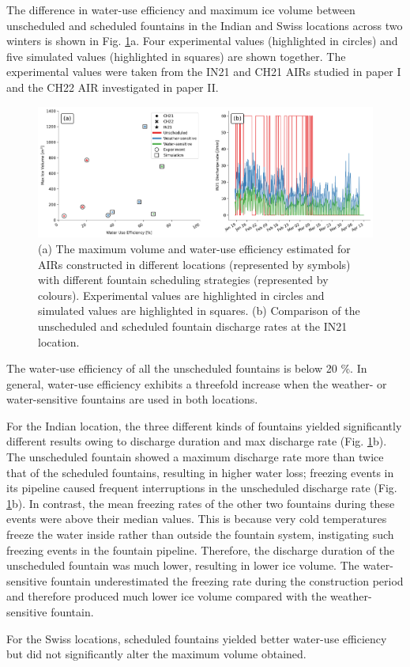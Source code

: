 The difference in water-use efficiency and maximum ice volume between unscheduled and scheduled fountains in the
Indian and Swiss locations across two winters is shown in Fig. \ref{fig:wue}a. Four experimental values
(highlighted in circles) and five simulated values (highlighted in squares) are shown together.  The
experimental values were taken from the IN21 and CH21 AIRs studied in paper I and the CH22 AIR investigated in
paper II.

\begin{figure}[htb]
	\includegraphics[width=\textwidth]{figs/wue.png}

	\caption{(a) The maximum volume and water-use efficiency estimated for AIRs constructed in different locations
		(represented by symbols) with different fountain scheduling strategies (represented by colours). Experimental
		values are highlighted in circles and simulated values are highlighted in squares. (b) Comparison of
		the unscheduled and scheduled fountain discharge rates at the IN21 location.}

	\label{fig:wue}
\end{figure}

The water-use efficiency of all the unscheduled fountains is below 20 \%. In general, water-use efficiency
exhibits a threefold increase when the weather- or water-sensitive fountains are used in both
locations.

For the Indian location, the three different kinds of fountains yielded significantly different results owing to discharge
duration and max discharge rate
(Fig. \ref{fig:wue}b). The unscheduled fountain showed a maximum discharge rate more than twice that of
the scheduled fountains, resulting in higher water loss; freezing events in its pipeline caused frequent
interruptions in the unscheduled discharge rate (Fig. \ref{fig:wue}b). In contrast, the mean freezing
rates of the other two fountains during these events were above their median values. This is because very cold
temperatures freeze the water inside rather than outside the fountain system, instigating such freezing events in
the fountain pipeline. Therefore, the discharge duration of the unscheduled fountain was much lower, resulting in
lower ice volume. The water-sensitive fountain underestimated the freezing rate during the construction period
and therefore produced much lower ice volume compared with the weather-sensitive fountain.

For the Swiss locations, scheduled fountains yielded better water-use efficiency but did not significantly alter
the maximum volume obtained.

